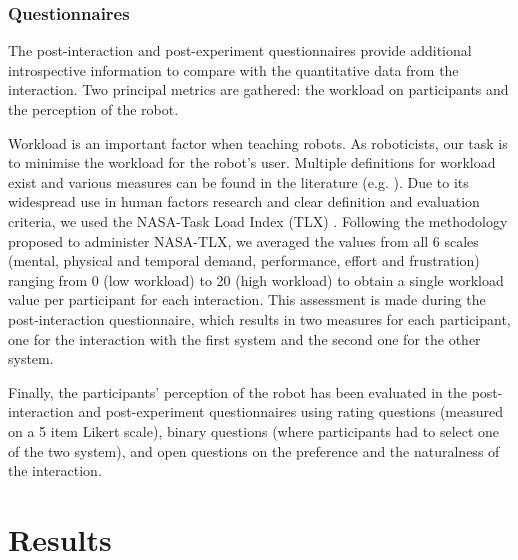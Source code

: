 \subsubsection{Questionnaires} \label{ssec:control_questionnaires}

The post-interaction and post-experiment questionnaires provide additional introspective information to compare with the quantitative data from the interaction. Two principal metrics are gathered: the workload on participants and the perception of the robot. 

Workload is an important factor when teaching robots. As roboticists, our task is to minimise the workload for the robot's user. Multiple definitions for workload exist and various measures can be found in the literature (e.g. \citealt{wierwille1983evaluation,moray2013mental}). Due to its widespread use in human factors research \citep{hart2006nasa} and clear definition and evaluation criteria, we used the NASA-Task Load Index (TLX) \citep{hart1988development}. Following the methodology proposed to administer NASA-TLX, we averaged the values from all 6 scales (mental, physical and temporal demand, performance, effort and frustration) ranging from 0 (low workload) to 20 (high workload) to obtain a single workload value per participant for each interaction. This assessment is made during the post-interaction questionnaire, which results in two measures for each participant, one for the interaction with the first system and the second one for the other system.

Finally, the participants' perception of the robot has been evaluated in the post-interaction and post-experiment questionnaires using rating questions (measured on a 5 item Likert scale), binary questions (where participants had to select one of the two system), and open questions on the preference and the naturalness of the interaction. 

\section{Results}

